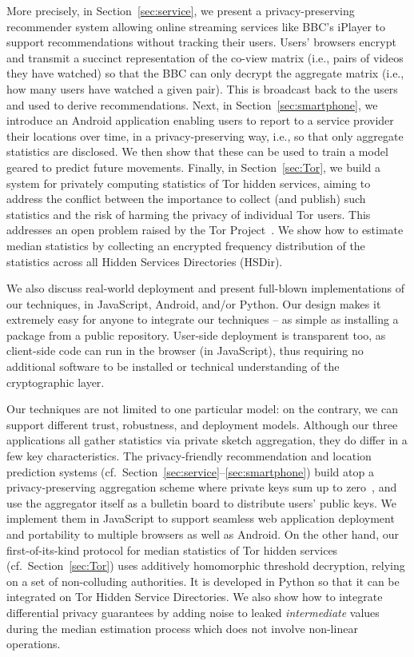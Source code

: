 \documentclass[conference]{IEEEtran}
\begin{document}
More precisely, in Section~\ref{sec:service}, we present a privacy-preserving recommender system allowing online streaming services like BBC's iPlayer to support recommendations without tracking their users. Users' browsers encrypt and transmit a  succinct representation of the co-view matrix (i.e., pairs of videos they have watched) so that the BBC can only decrypt the aggregate matrix (i.e., how many users have watched a given pair). This is broadcast back to the users and used to derive recommendations.
Next, in Section~\ref{sec:smartphone}, we introduce an Android application  enabling  users to report to a service provider their locations over time, in a privacy-preserving way, i.e., so that only aggregate statistics are disclosed.
We then show that these can be used to train a model geared to predict future movements.
Finally, in Section~\ref{sec:Tor}, we build a system for privately computing statistics of Tor hidden services, aiming to address the conflict between the importance to  collect (and publish) such statistics and the risk of  harming the privacy of individual Tor users. 
This  addresses an open problem raised by the Tor Project~\cite{goulethidden}. We show how to estimate median statistics by collecting an encrypted frequency distribution of the statistics across all Hidden Services Directories (HSDir).



We also discuss real-world deployment and present full-blown implementations of our techniques, in JavaScript, Android, and/or Python. Our  design makes it extremely easy for anyone to integrate our techniques -- as simple as installing a package from a public repository. User-side deployment is transparent too, as client-side code can run in the browser (in JavaScript), thus requiring no additional software to be installed or technical understanding of the cryptographic layer.


Our techniques are not limited to one particular model: on the contrary, we can support different trust, robustness, and deployment models. Although our three applications all gather statistics via private sketch aggregation, they do differ in a few key characteristics.  The privacy-friendly recommendation and location prediction systems (cf.~Section~\ref{sec:service}--\ref{sec:smartphone}) build atop a privacy-preserving aggregation scheme where private keys sum up to zero~\cite{Kursawe:2011,shi2011privacy}, and use the aggregator itself as a bulletin board to distribute users' public keys. 
We implement them in JavaScript to support seamless web application deployment and portability to multiple browsers as well as Android.
On the other hand, our first-of-its-kind protocol for median statistics of Tor hidden services (cf.~Section~\ref{sec:Tor}) uses additively homomorphic threshold decryption, relying on a set of non-colluding authorities. It is developed in Python so that it can be  integrated on Tor Hidden Service Directories. We also show how to integrate differential privacy guarantees by adding noise to leaked {\em intermediate} values during the median estimation process which does not involve non-linear operations.
\end{document}
